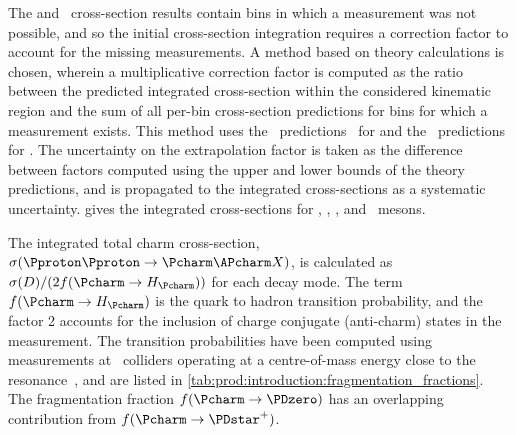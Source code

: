 The \PDzero and \PDstarp\ cross-section results contain bins in which a 
measurement was not possible, and so the initial cross-section integration 
requires a correction factor to account for the missing measurements.
A method based on theory calculations is chosen, wherein a multiplicative 
correction factor is computed as the ratio between the predicted integrated 
cross-section within the considered kinematic region and the sum of all per-bin 
cross-section predictions for bins for which a measurement exists.
This method uses the \nnpdfl\ predictions~\cite{Gauld:2015yia} for \PDzero and 
the \fonll\ predictions~\cite{Cacciari:2015fta} for \PDstarp.
The uncertainty on the extrapolation factor is taken as the difference between 
factors computed using the upper and lower bounds of the theory predictions, 
and is propagated to the integrated cross-sections as a systematic uncertainty.
 gives the integrated 
cross-sections for \PDzero, \PDplus, \PDsplus, and \PDstarp\ mesons.

The integrated total charm cross-section, $\xsec(\ppToccbarX)$, is calculated 
as $\xsec(D)/(2f(\cToHc))$ for each decay mode.
The term $f(\cToHc)$ is the quark to hadron transition probability, and the 
factor 2 accounts for the inclusion of charge conjugate (anti-charm) states in 
the measurement.
The transition probabilities have been computed using measurements at \epem\ 
colliders operating at a centre-of-mass energy close to the \PUpsilonFourS 
resonance~\cite{PDG2008}, and are listed in 
\cref{tab:prod:introduction:fragmentation_fractions}.
The fragmentation fraction $f(\decay{\Pcharm}{\PDzero})$ has an overlapping 
contribution
from $f(\decay{\Pcharm}{\PDstarp})$.

